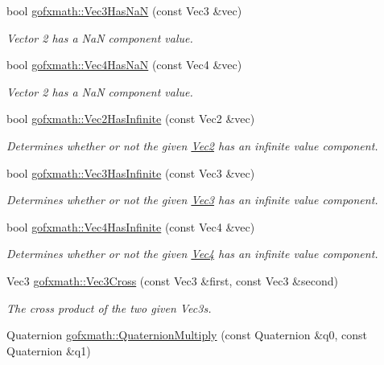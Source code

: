 \begin{DoxyCompactItemize}
bool \hyperlink{group___s_i_s_d_vec_math_ga5d19e3d1ee15741a65ede16f20e919a4}{gofxmath\+::\+Vec3\+Has\+Na\+N} (const Vec3 \&vec)
\begin{DoxyCompactList}\small\item\em Vector 2 has a Na\+N component value. \end{DoxyCompactList}\item 
bool \hyperlink{group___s_i_s_d_vec_math_gab82fdfebe73934664b56e9ba1174f37f}{gofxmath\+::\+Vec4\+Has\+Na\+N} (const Vec4 \&vec)
\begin{DoxyCompactList}\small\item\em Vector 2 has a Na\+N component value. \end{DoxyCompactList}\item 
bool \hyperlink{group___s_i_s_d_vec_math_ga6eb96a6532361189c7cacdbd9ae95c90}{gofxmath\+::\+Vec2\+Has\+Infinite} (const Vec2 \&vec)
\begin{DoxyCompactList}\small\item\em Determines whether or not the given \hyperlink{classgofxmath_1_1_vec2}{Vec2} has an infinite value component. \end{DoxyCompactList}\item 
bool \hyperlink{group___s_i_s_d_vec_math_gae5205e805b23de865db9a40e5936f82a}{gofxmath\+::\+Vec3\+Has\+Infinite} (const Vec3 \&vec)
\begin{DoxyCompactList}\small\item\em Determines whether or not the given \hyperlink{classgofxmath_1_1_vec3}{Vec3} has an infinite value component. \end{DoxyCompactList}\item 
bool \hyperlink{group___s_i_s_d_vec_math_ga29cd467d514b701c3a796cb75234be0b}{gofxmath\+::\+Vec4\+Has\+Infinite} (const Vec4 \&vec)
\begin{DoxyCompactList}\small\item\em Determines whether or not the given \hyperlink{classgofxmath_1_1_vec4}{Vec4} has an infinite value component. \end{DoxyCompactList}\item 
Vec3 \hyperlink{group___s_i_s_d_vec_math_ga455b2ef17c947a780f2b2b9e4b6cccc8}{gofxmath\+::\+Vec3\+Cross} (const Vec3 \&first, const Vec3 \&second)
\begin{DoxyCompactList}\small\item\em The cross product of the two given Vec3s. \end{DoxyCompactList}\item 
Quaternion \hyperlink{group___s_i_s_d_vec_math_ga01d5534572884ea932229ccb1aa17ac1}{gofxmath\+::\+Quaternion\+Multiply} (const Quaternion \&q0, const Quaternion \&q1)

\end{DoxyCompactItemize}
